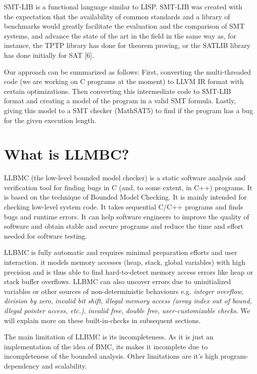 \documentclass[14pt]{article}
\begin{document}
SMT-LIB is a functional language similar to LISP. SMT-LIB was created with the expectation that the availability of common standards and a library of benchmarks would greatly facilitate the evaluation and the comparison of SMT systems, and advance the state of the art in the field in the same way as, for instance, the TPTP library has done for theorem proving, or the SATLIB library has done initially for SAT [6]. 

Our approach can be summarized as follows: First, converting the multi-threaded code (we are working on C programs at the moment) to LLVM IR format with certain optimizations. Then converting this intermediate code to SMT-LIB format and creating a model of the program in a valid SMT formula. Lastly, giving this model to a SMT checker (MathSAT5) to find if the program has a bug for the given execution length. 


\section{What is LLMBC?}\label{overview-LLMBC}
LLBMC (the low-level bounded model checker) is a static software analysis and verification tool for finding bugs in C (and, to some extent, in C++) programs. It is based on the technique of Bounded Model Checking. It is mainly intended for checking low-level system code.  It takes sequential C/C++ programs and finds bugs and runtime errors. It can help 
software engineers to improve the quality of software and obtain stable and secure programs and reduce the time and effort needed for software testing. 

LLBMC is fully automatic and requires minimal preparation efforts and user interaction. it models memory accesses (heap, stack, global variables) with high precision and is thus able to find hard-to-detect memory access errors like heap or stack buffer overflows. LLBMC can also uncover errors due to uninitialized variables or other sources of non-deterministic behaviours e.g.  
\textit{integer overflow}, 
\textit{division by zero},
\textit{invalid bit shift},
\textit{illegal memory access (array index out of bound, illegal pointer access, etc.)},
\textit{invalid free},
\textit{double free},
\textit{user-customizable checks}.
We will explain more on these built-in-checks in subsequent sections. 

The main limitation of LLBMC is its incompleteness. As it is just an implementation of the idea of BMC, its makes it incomplete due to incompleteness of the bounded analysis. Other limitations are it's high program-dependency and scalability. 
\end{document}
